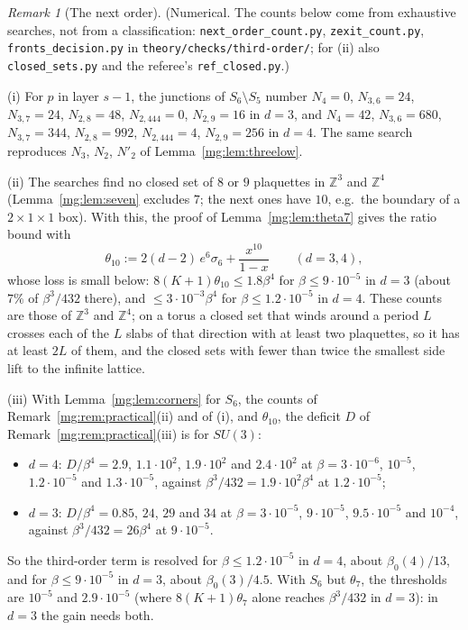 \documentclass[11pt,a4paper]{article}
\theoremstyle{definition}
\theoremstyle{remark}
\newtheorem{remark}[theorem]{Remark}
\newcommand{\Z}{\mathbb{Z}}
\begin{document}
\begin{remark}[The next order]\label{mg:rem:nextorder}
(Numerical. The counts below come from exhaustive searches, not from a classification: \texttt{next\_order\_count.py}, \texttt{zexit\_count.py},
\texttt{fronts\_decision.py} in \texttt{theory/checks/third-order/}; for (ii) also \texttt{closed\_sets.py} and the referee's \texttt{ref\_closed.py}.)

(i) For $p$ in layer $s-1$, the junctions of $S_6\setminus S_5$ number $N_4=0$, $N_{3,6}=24$, $N_{3,7}=24$, $N_{2,8}=48$, $N_{2,444}=0$, $N_{2,9}=16$ in $d=3$, and $N_4=42$,
$N_{3,6}=680$, $N_{3,7}=344$, $N_{2,8}=992$, $N_{2,444}=4$, $N_{2,9}=256$ in $d=4$. The same search reproduces $N_3$, $N_2$, $N'_2$ of Lemma~\ref{mg:lem:threelow}.

(ii) The searches find no closed set of $8$ or $9$ plaquettes in $\Z^3$ and $\Z^4$ (Lemma~\ref{mg:lem:seven} excludes $7$; the next ones have $10$, e.g.\ the boundary of a
$2\times1\times1$ box). With this, the proof of Lemma~\ref{mg:lem:theta7} gives the ratio bound with
\[
\theta_{10}:=2(d-2)\,e^6\sigma_6+\frac{x^{10}}{1-x}\qquad(d=3,4),
\]
whose loss is small below: $8(K+1)\theta_{10}\le1.8\beta^4$ for $\beta\le9\cdot10^{-5}$ in $d=3$ (about $7\%$ of $\beta^3/432$ there), and $\le3\cdot10^{-3}\beta^4$ for $\beta\le1.2\cdot10^{-5}$ in
$d=4$. These counts are those of $\Z^3$ and $\Z^4$; on a torus a closed set that winds around a period $L$ crosses each of the $L$ slabs of that direction with at least two
plaquettes, so it has at least $2L$ of them, and the closed sets with fewer than twice the smallest side lift to the infinite lattice.

(iii) With Lemma~\ref{mg:lem:corners} for $S_6$, the counts of Remark~\ref{mg:rem:practical}(ii) and of (i), and $\theta_{10}$, the deficit $D$ of Remark~\ref{mg:rem:practical}(iii) is for $SU(3)$:
\begin{itemize}
\item $d=4$: $D/\beta^4=2.9$, $1.1\cdot10^2$, $1.9\cdot10^2$ and $2.4\cdot10^2$ at $\beta=3\cdot10^{-6}$, $10^{-5}$, $1.2\cdot10^{-5}$ and $1.3\cdot10^{-5}$, against $\beta^3/432=1.9\cdot10^2\beta^4$
at $1.2\cdot10^{-5}$;
\item $d=3$: $D/\beta^4=0.85$, $24$, $29$ and $34$ at $\beta=3\cdot10^{-5}$, $9\cdot10^{-5}$, $9.5\cdot10^{-5}$ and $10^{-4}$, against $\beta^3/432=26\beta^4$ at $9\cdot10^{-5}$.
\end{itemize}
So the third-order term is resolved for $\beta\le1.2\cdot10^{-5}$ in $d=4$, about $\beta_0(4)/13$, and for $\beta\le9\cdot10^{-5}$ in $d=3$, about $\beta_0(3)/4.5$. With $S_6$ but $\theta_7$, the
thresholds are $10^{-5}$ and $2.9\cdot10^{-5}$ (where $8(K+1)\theta_7$ alone reaches $\beta^3/432$ in $d=3$): in $d=3$ the gain needs both.


\end{remark}
\end{document}
